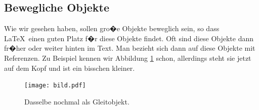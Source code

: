 \documentclass[11pt,a4paper]{article} %
\begin{document}
\subsection{Bewegliche Objekte}
\label{Floats}

Wie wir gesehen haben, sollen gro�e Objekte beweglich sein, so dass \LaTeX\ einen guten Platz f�r diese Objekte findet. Oft sind diese Objekte dann fr�her oder weiter hinten im Text. Man bezieht sich dann auf diese Objekte mit Referenzen. Zu Beispiel kennen wir Abbildung \ref{bild} schon, allerdings steht sie jetzt auf dem Kopf und ist ein bisschen kleiner.

\begin{figure}[h]
\begin{center}
\texttt{[image: bild.pdf]}
\caption{Dasselbe nochmal als Gleitobjekt. \label{bild}}
\end{center}
\end{figure}

\end{document}
